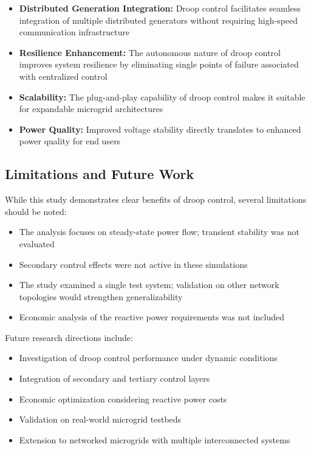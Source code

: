 \begin{itemize}
    \item \textbf{Distributed Generation Integration:} Droop control facilitates seamless integration of multiple distributed generators without requiring high-speed communication infrastructure
    
    \item \textbf{Resilience Enhancement:} The autonomous nature of droop control improves system resilience by eliminating single points of failure associated with centralized control
    
    \item \textbf{Scalability:} The plug-and-play capability of droop control makes it suitable for expandable microgrid architectures
    
    \item \textbf{Power Quality:} Improved voltage stability directly translates to enhanced power quality for end users
\end{itemize}

\subsection{Limitations and Future Work}

While this study demonstrates clear benefits of droop control, several limitations should be noted:

\begin{itemize}
    \item The analysis focuses on steady-state power flow; transient stability was not evaluated
    \item Secondary control effects were not active in these simulations
    \item The study examined a single test system; validation on other network topologies would strengthen generalizability
    \item Economic analysis of the reactive power requirements was not included
\end{itemize}

Future research directions include:
\begin{itemize}
    \item Investigation of droop control performance under dynamic conditions
    \item Integration of secondary and tertiary control layers
    \item Economic optimization considering reactive power costs
    \item Validation on real-world microgrid testbeds
    \item Extension to networked microgrids with multiple interconnected systems
\end{itemize}

